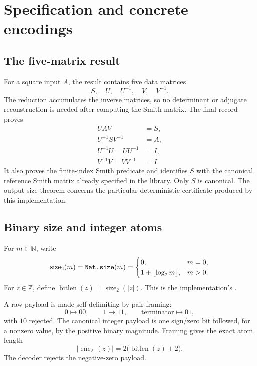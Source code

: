 \documentclass[11pt]{article}
\theoremstyle{definition}
\newcommand{\Z}{\mathbb{Z}}
\newcommand{\N}{\mathbb{N}}
\newcommand{\bitlen}{\operatorname{bitlen}}
\newcommand{\natsize}{\operatorname{size}_2}
\newcommand{\enc}{\operatorname{enc}}
\newcommand{\code}[1]{\texttt{\detokenize{#1}}}
\newcommand{\mcode}[1]{\text{\ttfamily\detokenize{#1}}}
\begin{document}
\section{Specification and concrete encodings}
\label{sec:statement}

\subsection{The five-matrix result}

For a square input $A$, the result contains five data matrices
\[
   S,\quad U,\quad U^{-1},\quad V,\quad V^{-1}.
\]
The reduction accumulates the inverse matrices, so no determinant or adjugate reconstruction is needed after computing the Smith matrix.  The final record proves
\begin{align}
  UAV &= S, \label{eq:forward}\\
  U^{-1}SV^{-1} &= A, \label{eq:backward}\\
  U^{-1}U=UU^{-1}&=I, \label{eq:uinv}\\
  V^{-1}V=VV^{-1}&=I. \label{eq:vinv}
\end{align}
It also proves the finite-index Smith predicate and identifies $S$ with the canonical reference Smith matrix already specified in the library.  Only $S$ is canonical.  The output-size theorem concerns the particular deterministic certificate produced by this implementation.

\subsection{Binary size and integer atoms}

For $m\in\N$, write
\[
 \natsize(m)=\mcode{Nat.size}(m)=
 \begin{cases}
  0,&m=0,\\
  1+\lfloor\log_2 m\rfloor,&m>0.
 \end{cases}
\]
For $z\in\Z$, define $\bitlen(z)=\natsize(|z|)$.  This is the implementation's \code{integerBitLength}.

A raw payload is made self-delimiting by pair framing:
\[
  0\mapsto 00,\qquad 1\mapsto 11,\qquad
  \text{terminator}\mapsto 01,
\]
with $10$ rejected.  The canonical integer payload is one sign/zero bit followed, for a nonzero value, by the positive binary magnitude.  Framing gives the exact atom length
\begin{equation}
  |\enc_{\Z}(z)|=2\bigl(\bitlen(z)+2\bigr).
  \label{eq:intatom}
\end{equation}
The decoder rejects the negative-zero payload.
\end{document}
